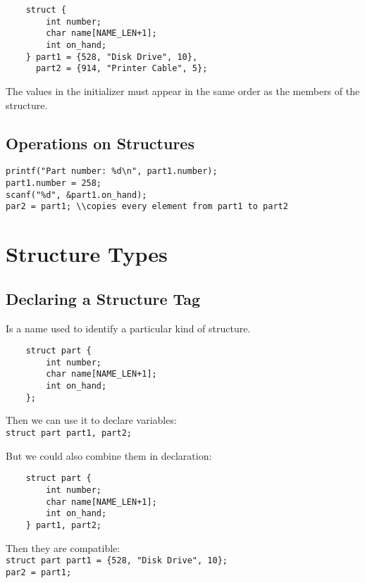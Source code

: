 \documentclass[openany]{book}
\begin{document}
    \begin{lstlisting}
    struct {
        int number;
        char name[NAME_LEN+1];
        int on_hand;
    } part1 = {528, "Disk Drive", 10},
      part2 = {914, "Printer Cable", 5};
    \end{lstlisting}

    The values in the initializer must appear in the same order as the members of the structure.

    \subsection*{Operations on Structures}

    \texttt{printf("Part number: \%d\textbackslash n", part1.number);} \\
    \texttt{part1.number = 258;} \\
    \texttt{scanf("\%d", \&part1.on\_hand);} \\
    \texttt{par2 = part1; \textbackslash \textbackslash copies every element from part1 to part2} \\
    
    \section{Structure Types}

    \subsection*{Declaring a Structure Tag}
    Is a name used to identify a particular kind of structure.

    \begin{lstlisting}
    struct part {
        int number;
        char name[NAME_LEN+1];
        int on_hand;
    };
    \end{lstlisting}

    Then we can use it to declare variables: \\
    \texttt{struct part part1, part2;}
    
    \bigskip

    But we could also combine them in declaration:
    \begin{lstlisting}
    struct part {
        int number;
        char name[NAME_LEN+1];
        int on_hand;
    } part1, part2;
    \end{lstlisting}

    Then they are compatible: \\
    \texttt{struct part part1 = \{528, "Disk Drive", 10\};} \\
    \texttt{par2 = part1;}
\end{document}
